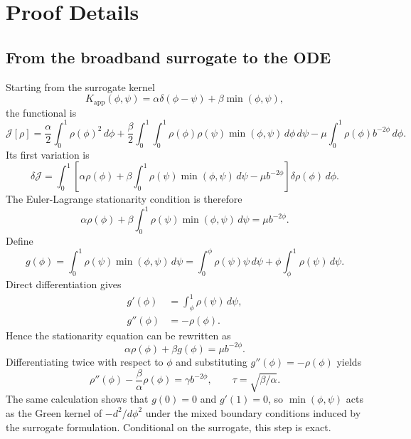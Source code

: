 \section{Proof Details}

\subsection{From the broadband surrogate to the ODE}

Starting from the surrogate kernel
\begin{equation}
K_{\mathrm{app}}(\phi,\psi)=\alpha\delta(\phi-\psi)+\beta\min(\phi,\psi),
\end{equation}
the functional is
\begin{equation}
\mathcal{J}[\rho]
=
\frac{\alpha}{2}\int_0^1 \rho(\phi)^2\,d\phi
+
\frac{\beta}{2}\int_0^1\int_0^1 \rho(\phi)\rho(\psi)\min(\phi,\psi)\,d\phi\,d\psi
- \mu\int_0^1 \rho(\phi)b^{-2\phi}\,d\phi.
\end{equation}
Its first variation is
\begin{equation}
\delta\mathcal{J}
=
\int_0^1
\left[
\alpha\rho(\phi)
+
\beta\int_0^1 \rho(\psi)\min(\phi,\psi)\,d\psi
- \mu b^{-2\phi}
\right]\delta\rho(\phi)\,d\phi.
\end{equation}
The Euler-Lagrange stationarity condition is therefore
\begin{equation}
\alpha\rho(\phi)
+
\beta\int_0^1 \rho(\psi)\min(\phi,\psi)\,d\psi
=
\mu b^{-2\phi}.
\end{equation}
Define
\begin{equation}
g(\phi)=\int_0^1 \rho(\psi)\min(\phi,\psi)\,d\psi
=
\int_0^\phi \rho(\psi)\psi\,d\psi
+
\phi\int_\phi^1 \rho(\psi)\,d\psi.
\end{equation}
Direct differentiation gives
\begin{align}
g'(\phi)
&=
\int_\phi^1 \rho(\psi)\,d\psi,\\
g''(\phi)
&=
-\rho(\phi).
\end{align}
Hence the stationarity equation can be rewritten as
\begin{equation}
\alpha \rho(\phi)+\beta g(\phi)=\mu b^{-2\phi}.
\end{equation}
Differentiating twice with respect to \(\phi\) and substituting \(g''(\phi)=-\rho(\phi)\) yields
\begin{equation}
\rho''(\phi)-\frac{\beta}{\alpha}\rho(\phi)=\gamma b^{-2\phi},
\qquad
\tau=\sqrt{\beta/\alpha}.
\end{equation}
The same calculation shows that \(g(0)=0\) and \(g'(1)=0\), so \(\min(\phi,\psi)\) acts as the Green kernel of \(-d^2/d\phi^2\) under the mixed boundary conditions induced by the surrogate formulation. Conditional on the surrogate, this step is exact.

